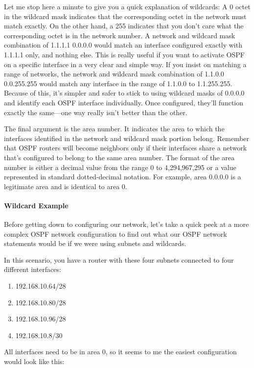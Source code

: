 Let me stop here a minute to give you a quick explanation of wildcards:
A 0 octet in the wildcard mask indicates that the corresponding octet in
the network must match exactly. On the other hand, a 255 indicates that
you don't care what the corresponding octet is in the network number. A
network and wildcard mask combination of 1.1.1.1 0.0.0.0 would match an
interface configured exactly with 1.1.1.1 only, and nothing else. This
is really useful if you want to activate OSPF on a specific interface in
a very clear and simple way. If you insist on matching a range of
networks, the network and wildcard mask combination of 1.1.0.0
0.0.255.255 would match any interface in the range of 1.1.0.0 to
1.1.255.255. Because of this, it's simpler and safer to stick to using
wildcard masks of 0.0.0.0 and identify each OSPF interface individually.
Once configured, they'll function exactly the same---one way really
isn't better than the other.

The final argument is the area number. It indicates the area to which
the interfaces identified in the network and wildcard mask portion
belong. Remember that OSPF routers will become neighbors only if their
interfaces share a network that's configured to belong to the same area
number. The format of the area number is either a decimal value from the
range 0 to 4,294,967,295 or a value represented in standard
dotted-decimal notation. For example, area 0.0.0.0 is a legitimate area
and is identical to area 0.

\paragraph{Wildcard Example}

Before getting down to configuring our network, let's take a quick peek
at a more complex OSPF network configuration to find out what our OSPF
network statements would be if we were using subnets and wildcards.

In this scenario, you have a router with these four subnets connected to
four different interfaces:

\begin{enumerate}
\tightlist
\item
  192.168.10.64/28
\item
  192.168.10.80/28
\item
  192.168.10.96/28
\item
  192.168.10.8/30
\end{enumerate}

All interfaces need to be in area 0, so it seems to me the easiest
configuration would look like this:


